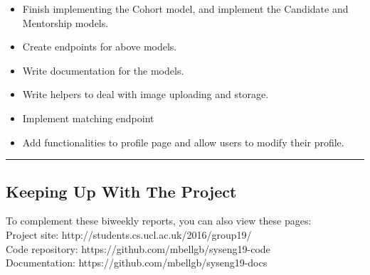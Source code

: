 \documentclass[11pt]{report}
\begin{document}
\bigskip
{}
\smallskip

\noindent
\begin{itemize}
    \item Finish implementing the Cohort model, and implement the Candidate and Mentorship models.
    \item Create endpoints for above models.
    \item Write documentation for the models.
    \item Write helpers to deal with image uploading and storage.
    \item Implement matching endpoint
    \item Add functionalities to profile page and allow users to modify their profile.
\end{itemize}

\hrule

\subsection*{Keeping Up With The Project}

To complement these biweekly reports, you can also view these pages:\\

\noindent
Project site: http://students.cs.ucl.ac.uk/2016/group19/\\

\noindent
Code repository: https://github.com/mbellgb/syseng19-code\\

\noindent
Documentation: https://github.com/mbellgb/syseng19-docs
\end{document}

